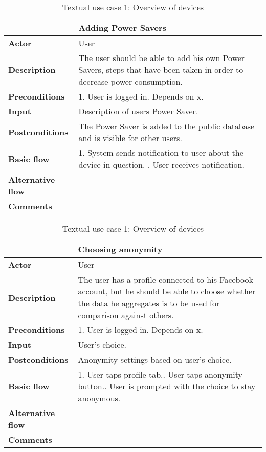 \begin{table}[H]
\begin{tabular}{|l|p{12cm}|}
\hline
&\textbf{Adding Power Savers}
\\\hline
\textbf{Actor} &User
\\\hline
\textbf{Description}&
The user should be able to add his own Power Savers, steps that have been taken in order to decrease power consumption.\\\hline
\textbf{Preconditions}&
1. User is logged in.\newline
Depends on x.\\\hline
\textbf{Input}&
Description of users Power Saver.
\\\hline
\textbf{Postconditions}& 
The Power Saver is added to the public database and is visible for other users.
\\\hline
\textbf{Basic flow}&
1. System sends notification to user about the device in question. \newline
2. User receives notification.\newline
\\\hline
\textbf{Alternative flow}&\\\hline
\textbf{Comments}& \\\hline
\end{tabular}
\caption{Textual use case 1: Overview of devices}
\end{table}


\begin{table}[H]
\begin{tabular}{|l|p{12cm}|}
\hline
&\textbf{Choosing anonymity}
\\\hline
\textbf{Actor} &User
\\\hline
\textbf{Description}&
The user has a profile connected to his Facebook-account, but he should be able to choose whether the data he aggregates is to be used for comparison against others.\\\hline
\textbf{Preconditions}&
1. User is logged in.\newline
Depends on x.\\\hline
\textbf{Input}&
User's choice.
\\\hline
\textbf{Postconditions}& 
Anonymity settings based on user's choice.
\\\hline
\textbf{Basic flow}&
1. User taps profile tab.\newline
2. User taps anonymity button.\newline
3. User is prompted with the choice to stay anonymous.\newline
\\\hline
\textbf{Alternative flow}&\\\hline
\textbf{Comments}& \\\hline
\end{tabular}
\caption{Textual use case 1: Overview of devices}
\end{table}

